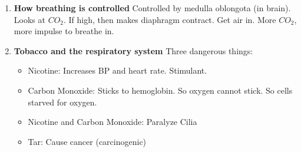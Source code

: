 \documentclass[9pt]{article}
\begin{document}
\begin{enumerate}
\begin{itemize}
    \end{itemize}
  \item {\bf How breathing is controlled} Controlled by medulla
    oblongota (in brain). Looks at $CO_2$. If high, then makes
    diaphragm contract. Get air in. More $CO_2$, more impulse to
    breathe in.
  \item {\bf Tobacco and the respiratory system} Three dangerous
    things:
    \begin{itemize}
    \item Nicotine: Increases BP and heart rate. Stimulant.
    \item Carbon Monoxide: Sticks to hemoglobin. So oxygen cannot stick. So cells starved for oxygen.
    \item Nicotine and Carbon Monoxide: Paralyze Cilia
    \item Tar: Cause cancer (carcinogenic)
    \end{itemize}
\end{enumerate}
\end{document}
